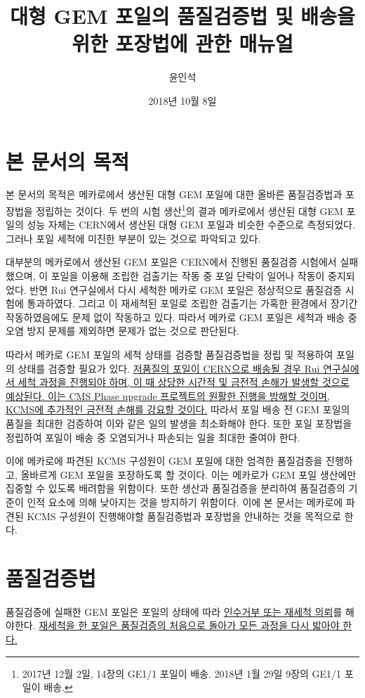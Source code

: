 \documentclass[11pt]{article}
\title{대형 GEM 포일의 품질검증법 및 배송을 위한 포장법에 관한  매뉴얼}
\author{윤인석}
\date{2018년 10월 8일}
\begin{document}
\maketitle
\tableofcontents
\listoffigures
\listoftables


\section{본 문서의 목적}
본 문서의 목적은 메카로에서 생산된 대형 GEM 포일에 대한 올바른 품질검증법과 포장법을 정립하는 것이다. 두 번의 시험 생산\footnote{2017년 12월 2일, 14장의 GE1/1 포일이 배송. 2018년 1월 29일 9장의 GE1/1 포일이 배송.}의 결과 메카로에서 생산된 대형 GEM 포일의 성능 자체는 CERN에서 생산된 대형 GEM 포일과 비슷한 수준으로 측정되었다. 그러나 포일 세척에 미진한 부분이 있는 것으로 파악되고 있다.

대부분의 메카로에서 생산된 GEM 포일은 CERN에서 진행된 품질검증 시험에서 실패했으며, 이 포일을 이용해 조립한 검출기는 작동 중 포일 단락이 일어나 작동이 중지되었다. 반면  Rui 연구실에서 다시 세척한 메카로 GEM 포일은 정상적으로 품질검증 시험에 통과하였다. 그리고 이 재세척된 포일로 조립한 검출기는 가혹한 환경에서 장기간 작동하였음에도 문제 없이 작동하고 있다. 따라서 메카로 GEM 포일은 세척과 배송 중 오염 방지 문제를 제외하면 문제가 없는 것으로 판단된다.

따라서 메카로 GEM 포일의 세척 상태를 검증할 품질검증법을 정립 및 적용하여 포일의 상태를 검증할 필요가 있다. \uline{저품질의 포일이 CERN으로 배송될 경우 Rui 연구실에서 세척 과정을 진행되야 하며, 이 때 상당한 시간적 및 금전적 손해가 발생할 것으로 예상된다. 이는 CMS Phase  upgrade 프로젝트의 원활한 진행을 방해할 것이며, KCMS에 추가적인 금전적 손해를 강요할 것이다.} 따라서 포일 배송 전 GEM 포일의 품질을 최대한 검증하여 이와 같은 일의 발생을 최소화해야 한다. 또한 포일 포장법을 정립하여 포일이 배송 중 오염되거나 파손되는 일을 최대한 줄여야 한다.

이에 메카로에 파견된 KCMS 구성원이 GEM 포일에 대한 엄격한 품질검증을 진행하고, 올바르게 GEM 포일을 포장하도록 할 것이다. 이는 메카로가 GEM 포일 생산에만 집중할 수 있도록 배려함을 위함이다. 또한 생산과 품질검증을 분리하여 품질검증의 기준이 인적 요소에 의해 낮아지는 것을 방지하기 위함이다. 이에 본 문서는 메카로에 파견된 KCMS 구성원이 진행해야할 품질검증법과 포장법을 안내하는 것을 목적으로 한다.

\section{품질검증법}
품질검증에 실패한 GEM 포일은 포일의 상태에 따라 \uline{인수거부 또는 재세척 의뢰}를 해야한다. \uline{재세척을 한 포일은 품질검증의 처음으로 돌아가 모든 과정을 다시 밟아야 한다.} 
\end{document}
